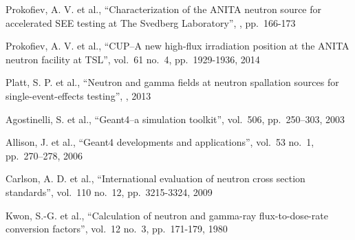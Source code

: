 \documentclass[peerreviewca,11pt,a4paper]{IEEEtran}
\begin{document}
\begin{thebibliography}{99} %

Prokofiev, A. V. et al.,
\newblock ``Characterization of the ANITA neutron source for accelerated SEE testing at The Svedberg Laboratory'',
, pp.~166-173

Prokofiev, A. V. et al.,
\newblock ``CUP--A new high-flux irradiation position at the ANITA neutron facility at TSL'',		 vol.~61 no.~4, pp.~1929-1936, 2014

Platt, S. P. et al.,
\newblock ``Neutron and gamma fields at neutron spallation sources for single-event-effects testing'',
, 2013

Agostinelli, S. et al.,
\newblock``Geant4--a simulation toolkit'',
 vol.~506, pp.~250--303, 2003

Allison, J. et al.,
\newblock ``Geant4 developments and applications'',
 vol.~53 no.~1, pp.~270--278, 2006

Carlson, A. D. et al.,
\newblock ``International evaluation of neutron cross section standards'',
 vol.~110 no.~12, pp.~3215-3324, 2009

Kwon, S.-G. et al.,
\newblock ``Calculation of neutron and gamma-ray flux-to-dose-rate conversion factors'',
 vol.~12 no.~3, pp.~171-179, 1980

\end{thebibliography}

\cleardoublepage

\todos
\end{document}
